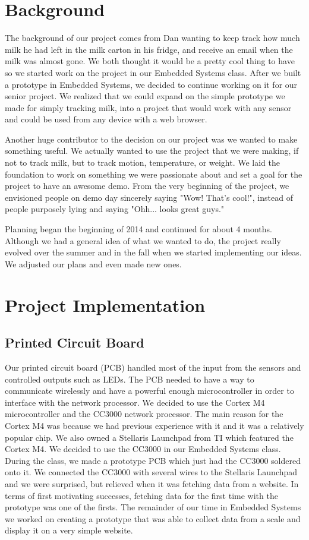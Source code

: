 \documentclass[letterpaper, 12 pt]{article}
\begin{document}
\section{Background}
The background of our project comes from Dan wanting to keep track how much milk he had left in the milk carton in his fridge, and receive an email when the milk was almost gone. We both thought it would be a pretty cool thing to have so we started work on the project in our Embedded Systems class. After we built a prototype in Embedded Systems, we decided to continue working on it for our senior project. We realized that we could expand on the simple prototype we made for simply tracking milk, into a project that would work with any sensor and could be used from any device with a web browser. 

Another huge contributor to the decision on our project was we wanted to make something useful. We actually wanted to use the project that we were making, if not to track milk, but to track motion, temperature, or weight. We laid the foundation to work on something we were passionate about and set a goal for the project to have an awesome demo. From the very beginning of the project, we envisioned people on demo day sincerely saying "Wow! That’s cool!", instead of people purposely lying and saying "Ohh... looks great guys." 

Planning began the beginning of 2014 and continued for about 4 months. Although we had a general idea of what we wanted to do, the project really evolved over the summer and in the fall when we started implementing our ideas. We adjusted our plans and even made new ones. 

\section{Project Implementation}

\subsection{Printed Circuit Board}
Our printed circuit board (PCB) handled most of the input from the sensors and controlled outputs such as LEDs. The PCB needed to have a way to communicate wirelessly and have a powerful enough microcontroller in order to interface with the network processor. We decided to use the Cortex M4 microcontroller and the CC3000 network processor. The main reason for the Cortex M4 was because we had previous experience with it and it was a relatively popular chip. We also owned a Stellaris Launchpad  from TI which featured the Cortex M4. We decided to use the CC3000 in our Embedded Systems class. During the class, we made a prototype PCB which just had the CC3000 soldered onto it. We connected the CC3000 with several wires to the Stellaris Launchpad and we were surprised, but relieved when it was fetching data from a website. In terms of first motivating successes, fetching data for the first time with the prototype was one of the firsts. The remainder of our time in Embedded Systems we worked on creating a prototype that was able to collect data from a scale and display it on a very simple website. 
  
\end{document}
